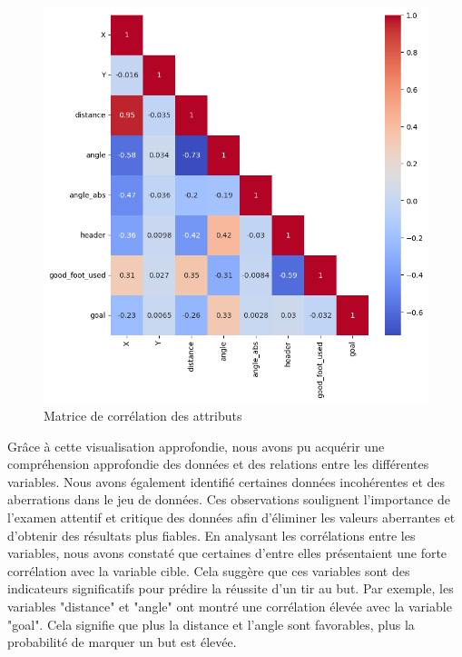 \documentclass[12pt]{article}
\begin{document}
\begin{figure}
    \centering
    \includegraphics[width=\textwidth]{img/correlation_matrix.png}
    \caption{Matrice de corrélation des attributs}
    \label{fig:correlation_matrix}
\end{figure}
\newpage
Grâce à cette visualisation approfondie, nous avons pu acquérir une compréhension approfondie des données et des relations entre les différentes variables. 
Nous avons également identifié certaines données incohérentes et des aberrations dans le jeu de données. 
Ces observations soulignent l'importance de l'examen attentif et critique des données afin d'éliminer les valeurs aberrantes et d'obtenir des résultats plus fiables.
\newline\newline
En analysant les corrélations entre les variables, nous avons constaté que certaines d'entre elles présentaient une forte corrélation avec la variable cible. 
Cela suggère que ces variables sont des indicateurs significatifs pour prédire la réussite d'un tir au but. 
Par exemple, les variables "distance" et "angle" ont montré une corrélation élevée avec la variable "goal". 
Cela signifie que plus la distance et l'angle sont favorables, plus la probabilité de marquer un but est élevée. 
\newline\newline
\end{document}
